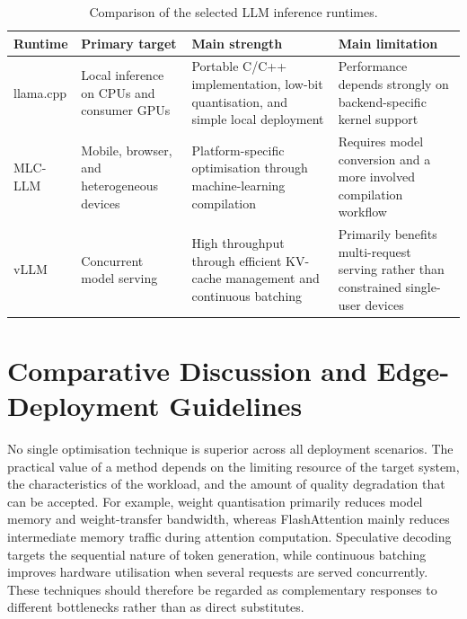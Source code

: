 \begin{table}[ht]

    \begin{tabularx}{\textwidth}{
        >{\raggedright\arraybackslash}p{1.6cm}
        >{\raggedright\arraybackslash}p{2.6cm}
        >{\raggedright\arraybackslash}X
        >{\raggedright\arraybackslash}X}
        \toprule
        \textbf{Runtime} &
        \textbf{Primary target} &
        \textbf{Main strength} &
        \textbf{Main limitation} \\
        \midrule

        llama.cpp &
        Local inference on CPUs and consumer GPUs &
        Portable C/C++ implementation, low-bit quantisation, and simple local
        deployment &
        Performance depends strongly on backend-specific kernel support \\

        MLC-LLM &
        Mobile, browser, and heterogeneous devices &
        Platform-specific optimisation through machine-learning compilation &
        Requires model conversion and a more involved compilation workflow \\

        vLLM &
        Concurrent model serving &
        High throughput through efficient KV-cache management and continuous
        batching &
        Primarily benefits multi-request serving rather than constrained
        single-user devices \\

        \bottomrule
    \end{tabularx}
        \centering
    \caption{Comparison of the selected LLM inference runtimes.}
    \label{tab:runtime-comparison}
    \small
\end{table}

\section{Comparative Discussion and Edge-Deployment Guidelines}
\label{sec:comparative-discussion}

No single optimisation technique is superior across all deployment scenarios. 
The practical value of a method depends on the limiting resource of the target 
system, the characteristics of the workload, and the amount of quality degradation 
that can be accepted. For example, weight quantisation primarily reduces model 
memory and weight-transfer bandwidth, whereas FlashAttention mainly reduces 
intermediate memory traffic during attention computation. Speculative decoding 
targets the sequential nature of token generation, while continuous batching 
improves hardware utilisation when several requests are served concurrently. 
These techniques should therefore be regarded as complementary responses to 
different bottlenecks rather than as direct substitutes.

